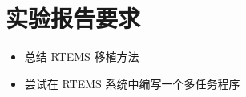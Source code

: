 \section{实验报告要求}
\begin{itemize}\itemsep=-3pt
  \item 总结 RTEMS 移植方法
  \item 尝试在 RTEMS 系统中编写一个多任务程序
\end{itemize}
